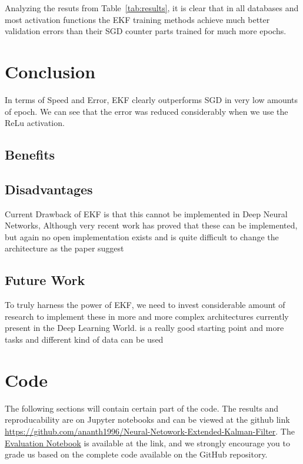 \documentclass{article}
\begin{document}
Analyzing the resuts from Table~\ref{tab:results}, it is clear that in all databases and most activation functions the EKF training methods achieve much better validation errors than their SGD counter parts trained for much more epochs.
\clearpage
\section{Conclusion }
In terms of Speed and Error, EKF clearly outperforms SGD in very low amounts of epoch. We can see that the error was reduced considerably when we use the ReLu activation.
\subsection{Benefits}
\subsection{Disadvantages}
Current Drawback of EKF is that this cannot be implemented in Deep Neural Networks,\cite{Evol} Although very recent work has proved that these can be implemented, but again no open implementation exists and is quite difficult to change the architecture as the paper suggest
\subsection{Future Work}
To truly harness the power of EKF, we need to invest considerable amount of research to implement these in more and more complex architectures currently present in the Deep Learning World. \cite{Evol} is a really good starting point and more tasks and different kind of data can be used 
\clearpage
\appendix
\appendixpage
\section{Code}
The following sections will contain certain part of the code. The results and reproducability are on Jupyter notebooks and can be viewed at the github link \url{https://github.com/ananth1996/Neural-Netowork-Extended-Kalman-Filter}. The  \href{https://github.com/ananth1996/Neural-Netowork-Extended-Kalman-Filter/blob/master/Evaluation.ipynb}{Evaluation Notebook} is available at the link, and we strongly encourage you to grade us based on the complete code available on the GitHub repository.
\end{document}
